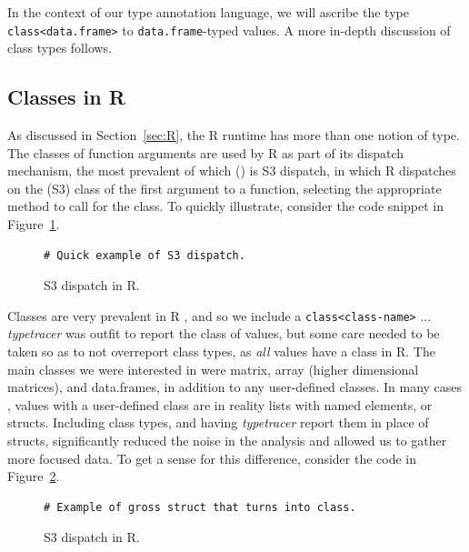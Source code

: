 \documentclass[acmsmall,review,anonymous]{acmart}\settopmatter{printfolios=true,printccs=false,printacmref=false}
\newcommand{\code}[1]{{\lstinline[style=Rin]!#1!}\xspace}
\newcommand{\typetracer}{\emph{typetracer}\xspace} %
\begin{document}
In the context of our type annotation language, we will ascribe the type \code{class<data.frame>} to \code{data.frame}-typed values.
A more in-depth discussion of class types follows.

%
%
%
%
\subsection{Classes in R}

As discussed in Section~\ref{sec:R}, the R runtime has more than one notion of type.  
The classes of function arguments are used by R as part of its dispatch mechanism, the most prevalent of which () is S3 dispatch, in which R dispatches on the (S3) class of the first argument to a function, selecting the appropriate method to call for the class.
To quickly illustrate, consider the code snippet in Figure~\ref{fig:dispatch-ex}.

\begin{figure}[htbp]
\begin{center}

\begin{lstlisting}
# Quick example of S3 dispatch.
\end{lstlisting}

\caption{S3 dispatch in R.}
\label{fig:dispatch-ex}
\end{center}
\end{figure}

Classes are very prevalent in R , and so we include a \code{class<class-name>} ... 
\typetracer was outfit to report the class of values, but some care needed to be taken so as to not overreport class types, as {\it all} values have a class in R.
The main classes we were interested in were matrix, array (higher dimensional matrices), and data.frames, in addition to any user-defined classes.
In many cases , values with a user-defined class are in reality lists with named elements, or structs.
Including class types, and having \typetracer report them in place of structs, significantly reduced the noise in the analysis and allowed us to gather more focused data.
To get a sense for this difference, consider the code in Figure~\ref{fig:class-vs-struct}.

\begin{figure}[htbp]
\begin{center}

\begin{lstlisting}
# Example of gross struct that turns into class.
\end{lstlisting}

\caption{S3 dispatch in R.}
\label{fig:class-vs-struct}
\end{center}
\end{figure}
\end{document}
